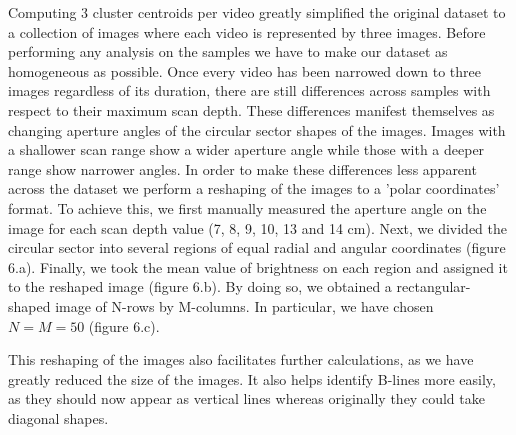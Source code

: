 \documentclass[11pt]{article} %
\begin{document}
	Computing 3 cluster centroids per video greatly simplified the original dataset to a collection of images where each video is represented by three images. Before performing any analysis on the samples we have to make our dataset as homogeneous as possible. Once every video has been narrowed down to three images regardless of its duration, there are still differences across samples with respect to their maximum scan depth. These differences manifest themselves as changing aperture angles of the circular sector shapes of the images. Images with a shallower scan range show a wider aperture angle while those with a deeper range show narrower angles. In order to make these differences less apparent across the dataset we perform a reshaping of the images to a 'polar coordinates' format. To achieve this, we first manually measured the aperture angle on the image for each scan depth value (7, 8, 9, 10, 13 and 14 cm). Next, we divided the circular sector into several regions of equal radial and angular coordinates (figure 6.a). Finally, we took the mean value of brightness on each region and assigned it to the reshaped image (figure 6.b). By doing so, we obtained a rectangular-shaped image of N-rows by M-columns. In particular, we have chosen $N = M = 50$ (figure 6.c).
	
	This reshaping of the images also facilitates further calculations, as we have greatly reduced the size of the images. It also helps identify B-lines more easily, as they should now appear as vertical lines whereas originally they could take diagonal shapes. 
	
\end{document}
